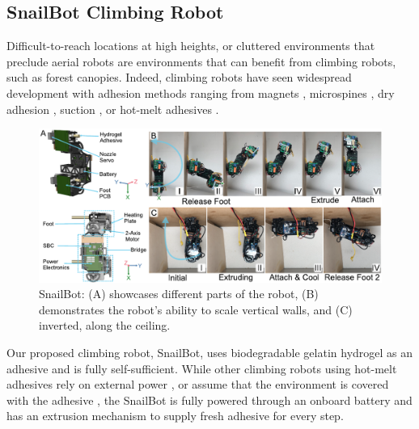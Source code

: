 \subsection{SnailBot Climbing Robot}

Difficult-to-reach locations at high heights, or cluttered environments that preclude aerial robots are environments that can benefit from climbing robots, such as forest canopies. Indeed, climbing robots have seen widespread development with adhesion methods ranging from magnets \cite{Hong2022}, microspines \cite{SangbaeKim2005, Lam2012}, dry adhesion \cite{Unver2006a, Kim2007, Liu2018a}, suction \cite{Ge2020, Yoshida2010d}, or hot-melt adhesives \cite{ROCHAT2011, Wang2013, Osswald2013}.


\begin{figure}
  \includegraphics[width=\linewidth]{chapters/papers/SB/figures/fig-6-snailbot-placeholder/fig-6-snailbot-placeholder.pdf}
  \caption{SnailBot: (A) showcases different parts of the robot, (B) demonstrates the robot's ability to scale vertical walls, and (C) inverted, along the ceiling.}
  \label{fig:fig6-placeholder}
\end{figure}

Our proposed climbing robot, SnailBot, uses biodegradable gelatin hydrogel as an adhesive and is fully self-sufficient. While other climbing robots using hot-melt adhesives rely on external power \cite{ROCHAT2011, Wang2013, Osswald2013}, or assume that the environment is covered with the adhesive \cite{Wang2013}, the SnailBot is fully powered through an onboard battery and has an extrusion mechanism to supply fresh adhesive for every step.

